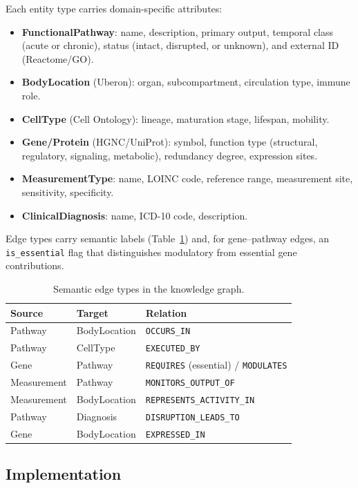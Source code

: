 \documentclass[12pt,a4paper]{article}
\begin{document}
Each entity type carries domain-specific attributes:

\begin{itemize}
    \item \textbf{FunctionalPathway}: name, description, primary output, temporal class (acute or chronic), status (intact, disrupted, or unknown), and external ID (Reactome/GO).
    \item \textbf{BodyLocation} (Uberon): organ, subcompartment, circulation type, immune role.
    \item \textbf{CellType} (Cell Ontology): lineage, maturation stage, lifespan, mobility.
    \item \textbf{Gene/Protein} (HGNC/UniProt): symbol, function type (structural, regulatory, signaling, metabolic), redundancy degree, expression sites.
    \item \textbf{MeasurementType}: name, LOINC code, reference range, measurement site, sensitivity, specificity.
    \item \textbf{ClinicalDiagnosis}: name, ICD-10 code, description.
\end{itemize}

Edge types carry semantic labels (Table~\ref{tab:edges}) and, for gene--pathway edges, an \texttt{is\_essential} flag that distinguishes modulatory from essential gene contributions.

\begin{table}[H]
\centering
\caption{Semantic edge types in the knowledge graph.}
\label{tab:edges}
\begin{tabular}{lll}
\toprule
\textbf{Source} & \textbf{Target} & \textbf{Relation} \\
\midrule
Pathway & BodyLocation & \texttt{OCCURS\_IN} \\
Pathway & CellType & \texttt{EXECUTED\_BY} \\
Gene & Pathway & \texttt{REQUIRES} (essential) / \texttt{MODULATES} \\
Measurement & Pathway & \texttt{MONITORS\_OUTPUT\_OF} \\
Measurement & BodyLocation & \texttt{REPRESENTS\_ACTIVITY\_IN} \\
Pathway & Diagnosis & \texttt{DISRUPTION\_LEADS\_TO} \\
Gene & BodyLocation & \texttt{EXPRESSED\_IN} \\
\bottomrule
\end{tabular}
\end{table}

\subsection{Implementation}
\label{sec:implementation}
\end{document}

